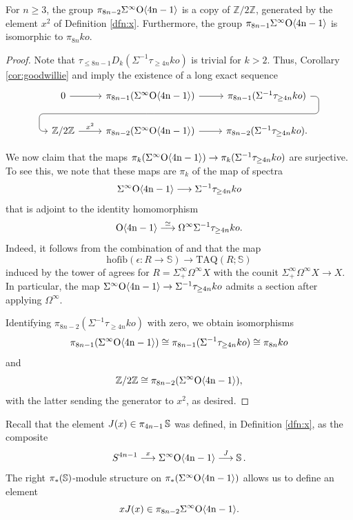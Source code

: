 \begin{cor} \label{cor:gen-by-x2}
For $n \ge 3$, the group $\pi_{8n-2}\Sigma^{\infty} \mathrm{O \langle 4n-1\rangle}$ is a copy of $\mathbb{Z}/2\mathbb{Z}$, generated by the element $x^2$ of Definition \ref{dfn:x}.
    Furthermore, the group $\pi_{8n-1} \Sigma^{\infty} \mathrm{O \langle 4n-1\rangle}$ is isomorphic to $\pi_{8n} ko$.
\end{cor}

\begin{proof}
    Note that $\tau_{\le 8n-1} D_k(\Sigma^{-1} \tau_{\ge 4n} ko)$ is trivial for $k >2$.  Thus, Corollary \ref{cor:goodwillie} and  imply the existence of a long exact sequence
$$
\begin{tikzcd}
0 \arrow{r} & \pi_{8n-1}(\sOf) \arrow{r} \arrow[draw=none]{d}[name=Z, shape=coordinate]{} & \pi_{8n-1}(\Sigma^{-1} \tau_{\ge 4n} ko) \arrow[rounded corners,to path={ -- ([xshift=2ex]\tikztostart.east)|- (Z) [near end]\tikztonodes-| ([xshift=-2ex]\tikztotarget.west)-- (\tikztotarget)}]{dll} \\
\Z/2\Z \arrow{r}{x^2} & \pi_{8n-2}(\sOf) \arrow{r} & \pi_{8n-2}(\Sigma^{-1} \tau_{\ge 4n} ko).
\end{tikzcd}
$$

We now claim that the maps
$\pi_{k}(\Sigma^{\infty} \mathrm{O \langle 4n-1\rangle}) \to \pi_{k}(\Sigma^{-1} \tau_{\ge 4n} ko)$ are surjective.  To see this, we note that these maps are $\pi_{k}$ of the map of spectra
$$\Sigma^{\infty} \mathrm{O \langle 4n-1\rangle} \longrightarrow \Sigma^{-1} \tau_{\ge 4n} ko$$
that is adjoint to the identity homomorphism
$$\mathrm{O \langle 4n-1\rangle} \stackrel{\simeq}{\longrightarrow} \Omega^{\infty} \Sigma^{-1} \tau_{\ge 4n} ko.$$
Indeed, it follows from the combination of \cite[Example 3.9]{KuhnTAQ} and \cite[Theorem 3.10(2)]{KuhnTAQ} that the map
$$\mathrm{hofib}(\epsilon:R \to \mathbb{S}) \to \mathrm{TAQ}(R;\mathbb{S})$$
induced by the tower of  agrees for $R=\Sigma^{\infty}_+ \Omega^{\infty} X$ with the counit $\Sigma^{\infty}_+ \Omega^{\infty}X \to X$.
In particular, the map $\Sigma^{\infty} \mathrm{O \langle 4n-1\rangle} \to \Sigma^{-1} \tau_{\ge 4n} ko$ admits a section after applying $\Omega^{\infty}.$ 

Identifying $\pi_{8n-2} (\Sigma^{-1} \tau_{\ge 4n} ko)$ with zero, we obtain isomorphisms
    \[\pi_{8n-1} (\Sigma^{\infty} \mathrm{O \langle 4n-1\rangle}) \cong \pi_{8n-1} (\Sigma^{-1} \tau_{\ge 4n} ko) \cong \pi_{8n} ko\]
    and
    \[\mathbb{Z}/2\mathbb{Z} \cong \pi_{8n-2} (\Sigma^{\infty} \mathrm{O \langle 4n-1\rangle}),\]
    with the latter sending the generator to $x^2$, as desired.
\end{proof}

\begin{cnstr}
Recall that the element $J(x) \in \pi_{4n-1} \operatorname{\mathbb{S}}$ was defined, in Definition \ref{dfn:x}, as the composite
$$S^{4n-1} \stackrel{x}{\longrightarrow} \Sigma^{\infty} \mathrm{O \langle 4n-1\rangle} \stackrel{J}{\longrightarrow} \operatorname{\mathbb{S}}.$$
The right $\pi_*(\operatorname{\mathbb{S}})$-module structure on $\pi_*(\Sigma^{\infty} \mathrm{O \langle 4n-1\rangle})$ allows us to define an element
$$xJ(x) \in \pi_{8n-2} \Sigma^{\infty} \mathrm{O \langle 4n-1\rangle}.$$
\end{cnstr}

